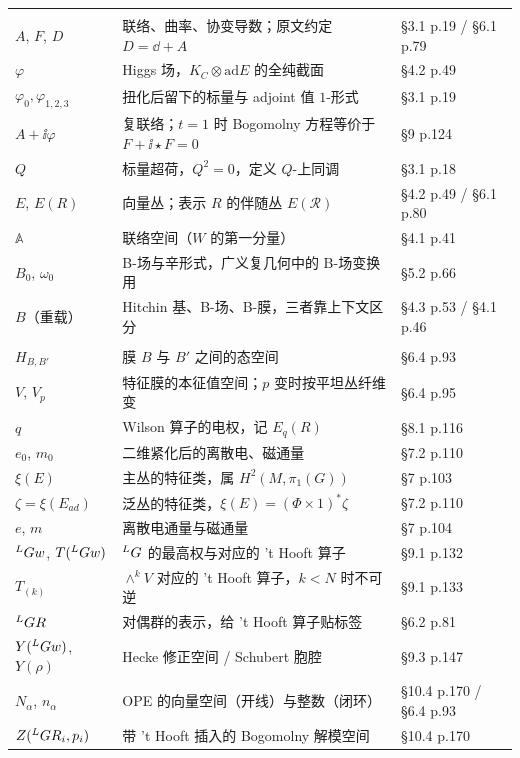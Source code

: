 \begin{longtable}{@{}>{\raggedright\arraybackslash}p{3.15cm}>{\raggedright\arraybackslash}p{9.05cm}>{\raggedright\arraybackslash}p{3.1cm}@{}}
\addlinespace[3pt]
\multicolumn{3}{@{}l}{\tabhead{场与算子}}\\
\addlinespace[1pt]
$A$, $F$, $D$ & 联络、曲率、协变导数；原文约定 $D=\dd+A$ & \S3.1 p.19 / \S6.1 p.79 \\
\addlinespace[1pt]
$\varphi$ & Higgs 场，$K_C\otimes\mathrm{ad}E$ 的全纯截面 & \S4.2 p.49 \\
\addlinespace[1pt]
$\varphi_{0},\varphi_{1,2,3}$ & 扭化后留下的标量与 adjoint 值 $1$-形式 & \S3.1 p.19 \\
\addlinespace[1pt]
$A+\ii\varphi$ & 复联络；$t=1$ 时 Bogomolny 方程等价于 $F+\ii\star F=0$ & \S9 p.124 \\
\addlinespace[1pt]
$Q$ & 标量超荷，$Q^2=0$，定义 $Q$-上同调 & \S3.1 p.18 \\
\addlinespace[1pt]
$E$, $E(R)$ & 向量丛；表示 $R$ 的伴随丛 $E(\mathcal R)$ & \S4.2 p.49 / \S6.1 p.80 \\
\addlinespace[1pt]
$\mathbb{A}$ & 联络空间（$W$ 的第一分量） & \S4.1 p.41 \\
\addlinespace[1pt]
$B_0$, $\omega_0$ & B-场与辛形式，广义复几何中的 B-场变换用 & \S5.2 p.66 \\
\addlinespace[1pt]
$B$（重载） & Hitchin 基、B-场、B-膜，三者靠上下文区分 & \S4.3 p.53 / \S4.1 p.46 \\

\addlinespace[3pt]
\multicolumn{3}{@{}l}{\tabhead{膜、算子与 Hecke 数据}}\\
\addlinespace[1pt]
$H_{B,B'}$ & 膜 $B$ 与 $B'$ 之间的态空间 & \S6.4 p.93 \\
\addlinespace[1pt]
$V$, $V_p$ & 特征膜的本征值空间；$p$ 变时按平坦丛纤维变 & \S6.4 p.95 \\
\addlinespace[1pt]
$q$ & Wilson 算子的电权，记 $E_q(R)$ & \S8.1 p.116 \\
\addlinespace[1pt]
$e_0$, $m_0$ & 二维紧化后的离散电、磁通量 & \S7.2 p.110 \\
\addlinespace[1pt]
$\xi(E)$ & 主丛的特征类，属 $H^2(M,\pi_1(G))$ & \S7 p.103 \\
\addlinespace[1pt]
$\zeta=\xi(E_{ad})$ & 泛丛的特征类，$\xi(E)=(\Phi\times1)^*\zeta$ & \S7.2 p.110 \\
\addlinespace[1pt]
$e$, $m$ & 离散电通量与磁通量 & \S7 p.104 \\
\addlinespace[1pt]
${}^{L}G w$, $T({}^{L}G w)$ & ${}^{L}G$ 的最高权与对应的 't Hooft 算子 & \S9.1 p.132 \\
\addlinespace[1pt]
$T_{(k)}$ & $\wedge^kV$ 对应的 't Hooft 算子，$k<N$ 时不可逆 & \S9.1 p.133 \\
\addlinespace[1pt]
${}^{L}G R$ & 对偶群的表示，给 't Hooft 算子贴标签 & \S6.2 p.81 \\
\addlinespace[1pt]
$Y({}^{L}G w)$, $Y(\rho)$ & Hecke 修正空间 / Schubert 胞腔 & \S9.3 p.147 \\
\addlinespace[1pt]
$N_\alpha$, $n_\alpha$ & OPE 的向量空间（开线）与整数（闭环） & \S10.4 p.170 / \S6.4 p.93 \\
\addlinespace[1pt]
$Z({}^{L}G R_i,p_i)$ & 带 't Hooft 插入的 Bogomolny 解模空间 & \S10.4 p.170 \\


\end{longtable}
